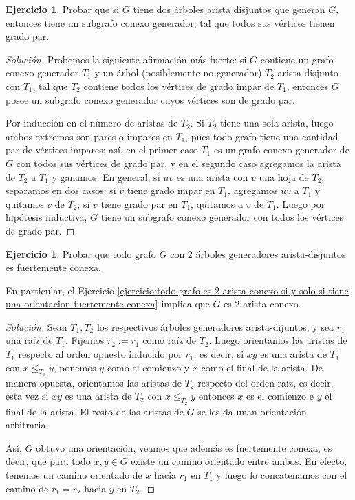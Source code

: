 \documentclass[12pt]{report}
\theoremstyle{plain}
\theoremstyle{definition}
\newtheorem{exercise}[theorem]{Ejercicio}
\newenvironment{solution}{\begin{proof}[Solución]}{\end{proof}}
\begin{document}
\begin{exercise}
Probar que si $G$ tiene dos árboles arista disjuntos que generan $G$, entonces tiene un subgrafo conexo generador, tal que todos sus vértices tienen grado par.
\end{exercise}
\begin{solution}
Probemos la siguiente afirmación más fuerte: si $G$ contiene un grafo conexo generador $T_1$ y un árbol (posiblemente no generador) $T_2$ arista disjunto con $T_1$, tal que $T_2$ contiene todos los vértices de grado impar de $T_1$, entonces $G$ posee un subgrafo conexo generador cuyos vértices son de grado par.

Por inducción en el número de aristas de $T_2$. Si $T_2$ tiene una sola arista, luego ambos extremos son pares o impares en $T_1$, pues todo grafo tiene una cantidad par de vértices impares; así, en el primer caso $T_1$ es un grafo conexo generador de $G$ con todos sus vértices de grado par, y en el segundo caso agregamos la arista de $T_2$ a $T_1 $ y ganamos. En general, si $uv$ es una arista con $v$ una hoja de $T_2$, separamos en dos casos: si $v$ tiene grado impar en $T_1$, agregamos $uv$ a $T_1$ y quitamos $v$ de $T_2$; si $v$ tiene grado par en $T_1$, quitamos a $v$ de $T_1$. Luego por hipótesis inductiva, $G$ tiene un subgrafo conexo generador con todos los vértices de grado par.
\end{solution}

\begin{exercise}
Probar que todo grafo $G$ con $2$ árboles generadores arista-disjuntos es fuertemente conexa.

En particular, el Ejercicio \ref{ejercicio:todo grafo es 2 arista conexo si y solo si tiene una orientacion fuertemente conexa} implica que $G$ es $2$-arista-conexo.
\end{exercise}
\begin{solution}
Sean $T_1, T_2$ los respectivos árboles generadores arista-dijuntos, y sea $r_1$ una raíz de $T_1$. Fijemos $r_2 := r_1$ como raíz de $T_2$. Luego orientamos las aristas de $T_1$ respecto al orden opuesto inducido por $r_1$, es decir, si $xy$ es una arista de $T_1$ con $x \leq_{T_1} y$, ponemos $y$ como el comienzo y $x$ como el final de la arista. De manera opuesta, orientamos las aristas de $T_2$ respecto del orden raíz, es decir, esta vez si $xy$ es una arista de $T_2$ con $x\leq_{T_2} y$ entonces $x$ es el comienzo e $y$ el final de la arista. El resto de las aristas de $G$ se les da unan orientación arbitraria.

Así, $G$ obtuvo una orientación, veamos que además es fuertemente conexa, es decir, que para todo $x,y \in G$ existe un camino orientado entre ambos. En efecto, tenemos un camino orientado de $x$ hacia $r_1$ en $T_1$ y luego lo concatenamos con el camino de $r_1 = r_2$ hacia $y$ en $T_2$.
\end{solution}
\end{document}
